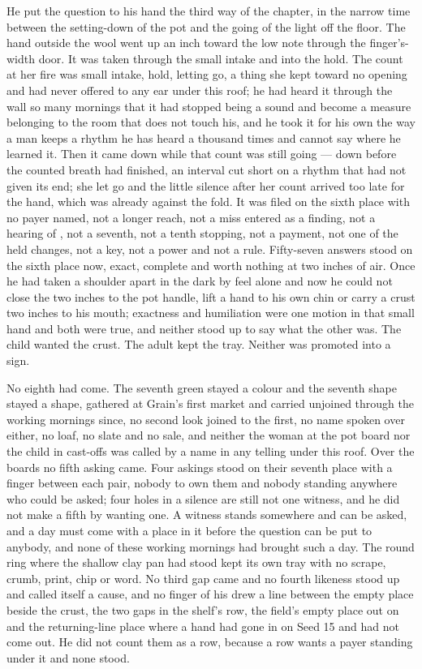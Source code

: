 He put the question to his hand the third way of the chapter, in the narrow time between the setting-down of the pot and the going of the light off the floor. The hand outside the wool went up an inch toward the low note through the finger's-width door. It was taken through the small intake and into the hold. The count at her fire was small intake, hold, letting go, a thing she kept toward no opening and had never offered to any ear under this roof; he had heard it through the wall so many mornings that it had stopped being a sound and become a measure belonging to the room that does not touch his, and he took it for his own the way a man keeps a rhythm he has heard a thousand times and cannot say where he learned it. Then it came down while that count was still going --- down before the counted breath had finished, an interval cut short on a rhythm that had not given its end; she let go and the little silence after her count arrived too late for the hand, which was already against the fold. It was filed on the sixth place with no payer named, not a longer reach, not a miss entered as a finding, not a hearing of , not a seventh, not a tenth stopping, not a payment, not one of the held changes, not a key, not a power and not a rule. Fifty-seven answers stood on the sixth place now, exact, complete and worth nothing at two inches of air. Once he had taken a shoulder apart in the dark by feel alone and now he could not close the two inches to the pot handle, lift a hand to his own chin or carry a crust two inches to his mouth; exactness and humiliation were one motion in that small hand and both were true, and neither stood up to say what the other was. The child wanted the crust. The adult kept the tray. Neither was promoted into a sign.

\scenebreak

No eighth had come. The seventh green stayed a colour and the seventh shape stayed a shape, gathered at Grain's first market and carried unjoined through the working mornings since, no second look joined to the first, no name spoken over either, no loaf, no slate and no sale, and neither the woman at the pot board nor the child in cast-offs was called by a name in any telling under this roof. Over the boards no fifth asking came. Four askings stood on their seventh place with a finger between each pair, nobody to own them and nobody standing anywhere who could be asked; four holes in a silence are still not one witness, and he did not make a fifth by wanting one. A witness stands somewhere and can be asked, and a day must come with a place in it before the question can be put to anybody, and none of these working mornings had brought such a day. The round ring where the shallow clay pan had stood kept its own tray with no scrape, crumb, print, chip or word. No third gap came and no fourth likeness stood up and called itself a cause, and no finger of his drew a line between the empty place beside the crust, the two gaps in the shelf's row, the field's empty place out on  and the returning-line place where a hand had gone in on Seed 15 and had not come out. He did not count them as a row, because a row wants a payer standing under it and none stood.

